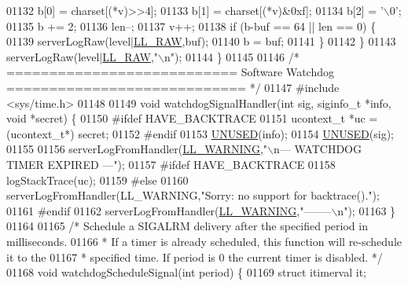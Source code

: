\begin{DoxyCode}
{{{{{{{{{{{{{{{{{{{{{{{{{{{{{{{{{{{{{{{{{{{{{{{{{{{{{{{{{{{{{{{{{{{{{{{{{{01132         b[0] = charset[(*v)>>4];
01133         b[1] = charset[(*v)&0xf];
01134         b[2] = \textcolor{stringliteral}{'\(\backslash\)0'};
01135         b += 2;
01136         len--;
01137         v++;
01138         \textcolor{keywordflow}{if} (b-buf == 64 || len == 0) \{
01139             serverLogRaw(level|\hyperlink{server_8h_a6b3768a4d2dfb3ac580b8d999baa9350}{LL\_RAW},buf);
01140             b = buf;
01141         \}
01142     \}
01143     serverLogRaw(level|\hyperlink{server_8h_a6b3768a4d2dfb3ac580b8d999baa9350}{LL\_RAW},\textcolor{stringliteral}{"\(\backslash\)n"});
01144 \}
01145 
01146 \textcolor{comment}{/* =========================== Software Watchdog ============================ */}
01147 \textcolor{preprocessor}{#}\textcolor{preprocessor}{include} \textcolor{preprocessor}{<}\textcolor{preprocessor}{sys}\textcolor{preprocessor}{/}\textcolor{preprocessor}{time}\textcolor{preprocessor}{.}\textcolor{preprocessor}{h}\textcolor{preprocessor}{>}
01148 
01149 \textcolor{keywordtype}{void} watchdogSignalHandler(\textcolor{keywordtype}{int} sig, siginfo\_t *info, \textcolor{keywordtype}{void} *secret) \{
01150 \textcolor{preprocessor}{#}\textcolor{preprocessor}{ifdef} HAVE\_BACKTRACE
01151     ucontext\_t *uc = (ucontext\_t*) secret;
01152 \textcolor{preprocessor}{#}\textcolor{preprocessor}{endif}
01153     \hyperlink{server_8h_ae7c9dc8f13568a9c856573751f1ee1ec}{UNUSED}(info);
01154     \hyperlink{server_8h_ae7c9dc8f13568a9c856573751f1ee1ec}{UNUSED}(sig);
01155 
01156     serverLogFromHandler(\hyperlink{server_8h_a31229b9334bba7d6be2a72970967a14b}{LL\_WARNING},\textcolor{stringliteral}{"\(\backslash\)n--- WATCHDOG TIMER EXPIRED ---"});
01157 \textcolor{preprocessor}{#}\textcolor{preprocessor}{ifdef} HAVE\_BACKTRACE
01158     logStackTrace(uc);
01159 \textcolor{preprocessor}{#}\textcolor{preprocessor}{else}
01160     serverLogFromHandler(LL\_WARNING,\textcolor{stringliteral}{"Sorry: no support for backtrace()."});
01161 \textcolor{preprocessor}{#}\textcolor{preprocessor}{endif}
01162     serverLogFromHandler(\hyperlink{server_8h_a31229b9334bba7d6be2a72970967a14b}{LL\_WARNING},\textcolor{stringliteral}{"--------\(\backslash\)n"});
01163 \}
01164 
01165 \textcolor{comment}{/* Schedule a SIGALRM delivery after the specified period in milliseconds.}
01166 \textcolor{comment}{ * If a timer is already scheduled, this function will re-schedule it to the}
01167 \textcolor{comment}{ * specified time. If period is 0 the current timer is disabled. */}
01168 \textcolor{keywordtype}{void} watchdogScheduleSignal(\textcolor{keywordtype}{int} period) \{
01169     \textcolor{keyword}{struct} itimerval it;
}}}}}}}}}}}}}}}}}}}}}}}}}}}}}}}}}}}}}}}}}}}}}}}}}}}}}}}}}}}}}}}}}}}}}}}}}}
\end{DoxyCode}
